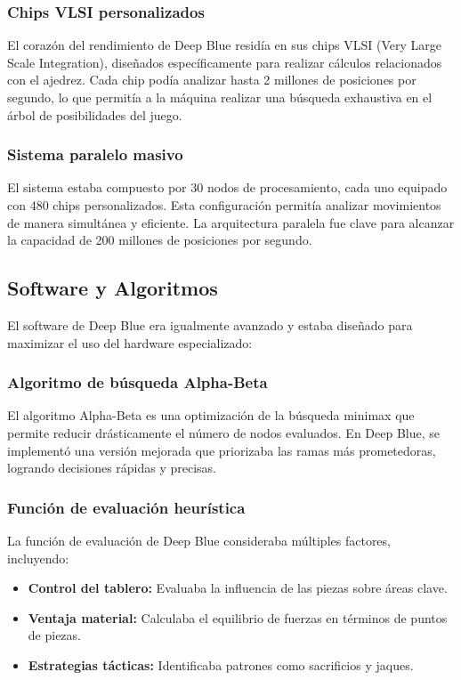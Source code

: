 \documentclass[12pt,a4paper]{article}
\begin{document}
\subsubsection*{Chips VLSI personalizados}
El corazón del rendimiento de Deep Blue residía en sus chips VLSI (Very Large Scale Integration), diseñados específicamente para realizar cálculos relacionados con el ajedrez. Cada chip podía analizar hasta 2 millones de posiciones por segundo, lo que permitía a la máquina realizar una búsqueda exhaustiva en el árbol de posibilidades del juego.

\subsubsection*{Sistema paralelo masivo}
El sistema estaba compuesto por 30 nodos de procesamiento, cada uno equipado con 480 chips personalizados. Esta configuración permitía analizar movimientos de manera simultánea y eficiente. La arquitectura paralela fue clave para alcanzar la capacidad de 200 millones de posiciones por segundo.

\subsection{Software y Algoritmos}
El software de Deep Blue era igualmente avanzado y estaba diseñado para maximizar el uso del hardware especializado:

\subsubsection*{Algoritmo de búsqueda Alpha-Beta}
El algoritmo Alpha-Beta es una optimización de la búsqueda minimax que permite reducir drásticamente el número de nodos evaluados. En Deep Blue, se implementó una versión mejorada que priorizaba las ramas más prometedoras, logrando decisiones rápidas y precisas.

\subsubsection*{Función de evaluación heurística}
La función de evaluación de Deep Blue consideraba múltiples factores, incluyendo:
\begin{itemize}
    \item \textbf{Control del tablero:} Evaluaba la influencia de las piezas sobre áreas clave.
    \item \textbf{Ventaja material:} Calculaba el equilibrio de fuerzas en términos de puntos de piezas.
    \item \textbf{Estrategias tácticas:} Identificaba patrones como sacrificios y jaques.
\end{itemize}
\end{document}
